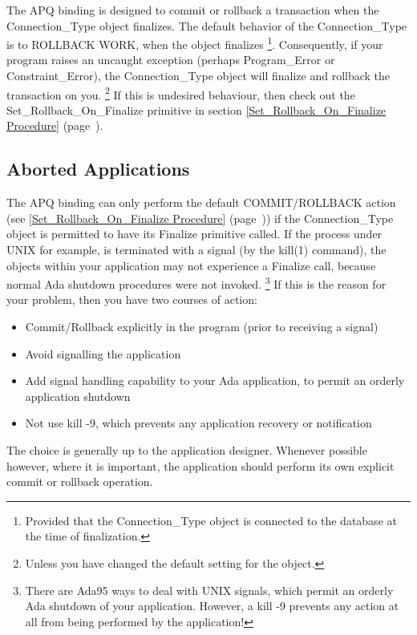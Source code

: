 \documentclass[english,letterpaper]{book}
\newcommand\Ref[1]{\textsection\ref{#1} (page~\pageref{#1})}
\begin{document}
The APQ binding is designed to commit or rollback a transaction when the
Connection\_Type object finalizes. The default behavior of the
Connection\_Type is to ROLLBACK WORK, when the object finalizes%
\footnote{Provided that the Connection\_Type object is connected to the
database at the time of finalization.}. Consequently, if your program
raises an uncaught exception (perhaps Program\_Error or
Constraint\_Error), the Connection\_Type object will finalize and
rollback the transaction on you. \footnote{Unless you have changed the
default setting for the object. } If this is undesired behaviour, then
check out the Set\_Rollback\_On\_Finalize primitive in section
\Ref{Set_Rollback_On_Finalize Procedure}.


\subsection{Aborted Applications}

The APQ binding can only perform the default COMMIT/ROLLBACK action
(see \Ref{Set_Rollback_On_Finalize Procedure}) if the Connection\_Type
object is permitted to have its Finalize primitive called. If the
process under UNIX for example, is terminated with a signal (by the
kill(1) command), the objects within your application may not experience
a Finalize call, because normal Ada shutdown procedures were not invoked.%
\footnote{There are Ada95 ways to deal with UNIX signals, which permit an orderly
Ada shutdown of your application. However, a kill -9 prevents any
action at all from being performed by the application!%
} If this is the reason for your problem, then you have two courses
of action:

\begin{itemize}
   \item Commit/Rollback explicitly in the program (prior to receiving a signal)
   \item Avoid signalling the application
   \item Add signal handling capability to your Ada application, to permit
         an orderly application shutdown
   \item Not use kill -9, which prevents any application recovery or notification
\end{itemize}

The choice is generally up to the application designer. Whenever possible
however, where it is important, the application should perform its
own explicit commit or rollback operation.
\end{document}
